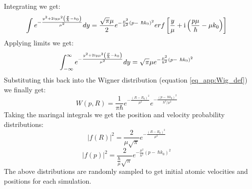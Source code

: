 Integrating we get:
\begin{equation}
  \int e^{-\frac{y^2 + 2 \mathrm{i} y\mu^{2}\left( \frac{p}{\hbar} - k_0\right)}{\mu^{2}}  } dy = \frac{\sqrt{\pi} \mu}{2} e^{-\frac{\mu^2}{\hbar^2} (p - \ \hbar k_0)^2} erf\left[\frac{y}{\mu} + \mathrm{i} \left(\frac{p \mu}{\hbar} - \mu k_0 \right)\right]
   \label{eq_app:step4}
\end{equation}
Applying limits we get:
\begin{equation}
  \int_{-\infty}^{\infty} e^{-\frac{y^2 + 2 \mathrm{i} y\mu^{2}\left( \frac{p}{\hbar} - k_0\right)}{\mu^{2}}  } dy = \sqrt{\pi} \mu e^{-\frac{\mu^2}{\hbar^2} \left(p - \ \hbar k_0 \right)^2}
  \label{eq_app:step5}
\end{equation}
Substituting this back into the Wigner distribution (equation \eqref{eq_app:Wig_def}) we finally get:
\begin{equation}
  W(p, R) = \frac{1}{\pi \hbar} e^{-\frac{(R - R_0)^2}{\mu^2}} e^{-\frac{\left(p - \ \hbar k_0 \right)^2}{\hbar^2/\mu^2}}
  \label{eq_app:step6}
\end{equation}
Taking the maringal integrals we get the position and velocity probability distributions:
\begin{equation}
  \vert f(R)\vert^2 = \frac{2}{\mu \sqrt{\pi}} e^{- \frac{(R - R_0)^2}{\mu^2}}
\end{equation}
\begin{equation}
  \vert f(p)\vert^2 = \frac{2}{\frac{\hbar}{\mu} \sqrt{\pi}} e^{- \frac{\mu^2}{\hbar^2}(p - \ \hbar k_0)^2}
\end{equation}
The above distributions are randomly sampled to get initial atomic velocities and positions for each simulation.




